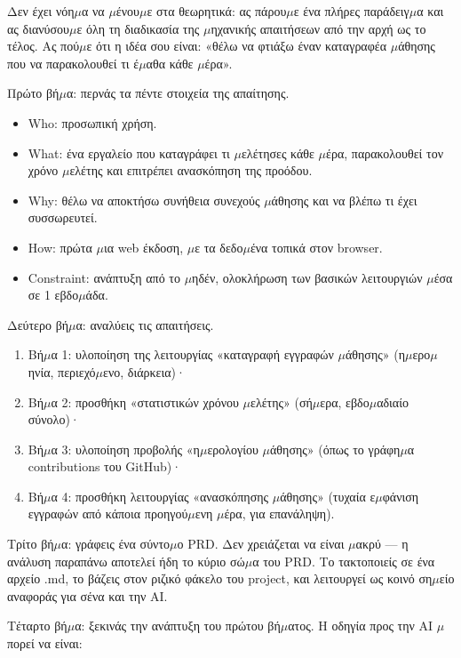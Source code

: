 
Δεν έχει νόη$\mu$α να $\mu$ένου$\mu$ε στα θεωρητικά: ας πάρου$\mu$ε ένα πλήρες παράδειγ$\mu$α και ας διανύσου$\mu$ε όλη τη διαδικασία της $\mu$ηχανικής απαιτήσεων από την αρχή ως το τέλος. Ας πού$\mu$ε ότι η ιδέα σου είναι: «θέλω να φτιάξω έναν καταγραφέα $\mu$άθησης που να παρακολουθεί τι έ$\mu$αθα κάθε $\mu$έρα».

Πρώτο βή$\mu$α: περνάς τα πέντε στοιχεία της απαίτησης.

\begin{itemize}
  \item Who: προσωπική χρήση.
  \item What: ένα εργαλείο που καταγράφει τι $\mu$ελέτησες κάθε $\mu$έρα, παρακολουθεί τον χρόνο $\mu$ελέτης και επιτρέπει ανασκόπηση της προόδου.
  \item Why: θέλω να αποκτήσω συνήθεια συνεχούς $\mu$άθησης και να βλέπω τι έχει συσσωρευτεί.
  \item How: πρώτα $\mu$ια web έκδοση, $\mu$ε τα δεδο$\mu$ένα τοπικά στον browser.
  \item Constraint: ανάπτυξη από το $\mu$ηδέν, ολοκλήρωση των βασικών λειτουργιών $\mu$έσα σε 1 εβδο$\mu$άδα.
\end{itemize}

Δεύτερο βή$\mu$α: αναλύεις τις απαιτήσεις.

\begin{enumerate}
  \item Βή$\mu$α 1: υλοποίηση της λειτουργίας «καταγραφή εγγραφών $\mu$άθησης» (η$\mu$ερο$\mu$ηνία, περιεχό$\mu$ενο, διάρκεια)·
  \item Βή$\mu$α 2: προσθήκη «στατιστικών χρόνου $\mu$ελέτης» (σή$\mu$ερα, εβδο$\mu$αδιαίο σύνολο)·
  \item Βή$\mu$α 3: υλοποίηση προβολής «η$\mu$ερολογίου $\mu$άθησης» (όπως το γράφη$\mu$α contributions του GitHub)·
  \item Βή$\mu$α 4: προσθήκη λειτουργίας «ανασκόπησης $\mu$άθησης» (τυχαία ε$\mu$φάνιση εγγραφών από κάποια προηγού$\mu$ενη $\mu$έρα, για επανάληψη).
\end{enumerate}

Τρίτο βή$\mu$α: γράφεις ένα σύντο$\mu$ο PRD. Δεν χρειάζεται να είναι $\mu$ακρύ — η ανάλυση παραπάνω αποτελεί ήδη το κύριο σώ$\mu$α του PRD. Το τακτοποιείς σε ένα αρχείο .md, το βάζεις στον ριζικό φάκελο του project, και λειτουργεί ως κοινό ση$\mu$είο αναφοράς για σένα και την AI.

Τέταρτο βή$\mu$α: ξεκινάς την ανάπτυξη του πρώτου βή$\mu$ατος. Η οδηγία προς την AI $\mu$πορεί να είναι:

